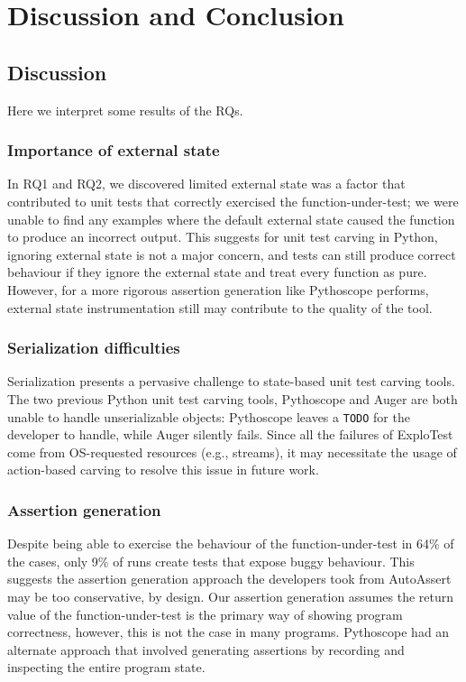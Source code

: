 \chapter{Discussion and Conclusion}

\section{Discussion}

Here we interpret some results of the RQs.

\subsection{Importance of external state}
In RQ1 and RQ2, we discovered limited external state was a factor that contributed to unit tests that
correctly exercised the function-under-test; we were unable to find any examples where the default external state
caused the function to produce an incorrect output. This suggests for unit test carving in Python,
ignoring external state is not a major concern, and tests can still produce correct behaviour if they ignore
the external state and treat every function as pure. However, for a more rigorous assertion generation like
Pythoscope performs, external state instrumentation still may contribute to the quality of the tool.

\subsection{Serialization difficulties}
Serialization presents a pervasive challenge to state-based unit test carving tools. The two previous Python unit test carving
tools, Pythoscope and Auger are both unable to handle unserializable objects: Pythoscope leaves a \verb|TODO| for the developer
to handle, while Auger silently fails. Since all the failures of ExploTest come from OS-requested resources (e.g., streams), it
may necessitate the usage of action-based carving to resolve this issue in future work.

\subsection{Assertion generation}
Despite being able to exercise the behaviour of the function-under-test in 64\% of the cases,
only 9\% of runs create tests that expose buggy behaviour. This suggests the assertion generation approach
the developers took from AutoAssert may be too conservative, by design. Our assertion generation
assumes the return value of the function-under-test is the primary way of showing program
correctness, however, this is not the case in many programs. Pythoscope had an alternate
approach that involved generating assertions by recording and inspecting the entire program state.

